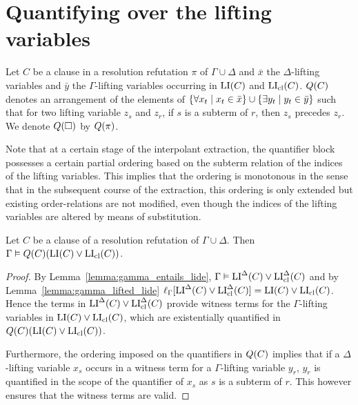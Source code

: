 \documentclass[,%
	draft=false,%
	numbers=noendperiod
	11pt,
	a4paper,
	oneside,%
	openany,
]{memoir}
\begin{document}
\section{Quantifying over the lifting variables}

\begin{defi}
	\label{def:arrow_quantifier_block}
	Let $C$ be a clause in a resolution refutation $\pi$ of $\Gamma\cup\Delta$
	and $\bar x$ the $\Delta$-lifting variables and $\bar y$ the $\Gamma$-lifting variables occurring in $\operatorname{LI}(C)$ and $\operatorname{LI}_{\operatorname{cl}}(C)$.
	$Q(C)$ denotes an arrangement of the elements of  $\{ \forall x_t \mid\nolinebreak x_t \in \bar x\} \cup \{ \exists y_t \mid y_t \in \bar y\}$ such that for two lifting variable $z_s$ and $z_r$, if $s$ is a subterm of $r$, then $z_s$ precedes $z_r$.
	We denote $Q(\square)$ by $Q(\pi)$.
\end{defi}

Note that at a certain stage of the interpolant extraction, the quantifier block possesses a certain partial ordering based on the subterm relation of the indices of the lifting variables.
This implies that the ordering is monotonous in the sense that in the subsequent course of the extraction, this ordering is only extended but existing order-relations are not modified, even though the indices of the lifting variables are altered by means of substitution.


\begin{lemma}
	\label{lemma:gamma_entails_quantified_lide}
	Let $C$ be a clause of a resolution refutation of $\Gamma\cup\Delta$. Then
	$\Gamma\vDash Q(C)(\operatorname{LI}(C) \lor \operatorname{LI}_{\operatorname{cl}}(C))$.
\end{lemma}
\begin{proof}
	By Lemma~\ref{lemma:gamma_entails_lide},
	$\Gamma\vDash \operatorname{LI}^\Delta(C) \lor \operatorname{LI}_{\operatorname{cl}}^\Delta(C)$ and 
	by Lemma~\ref{lemma:gamma_lifted_lide}
	$\ell_{\Gamma}[ \operatorname{LI}^\Delta(C) \lor \operatorname{LI}_{\operatorname{cl}}^\Delta(C)] = \operatorname{LI}(C) \lor \operatorname{LI}_{\operatorname{cl}}(C)$.
	Hence the terms in $\operatorname{LI}^\Delta(C) \lor \operatorname{LI}_{\operatorname{cl}}^\Delta(C)$ provide witness terms for the $\Gamma$-lifting variables in $\operatorname{LI}(C) \lor \operatorname{LI}_{\operatorname{cl}}(C)$, which are existentially quantified in $Q(C) (\operatorname{LI}(C) \lor \operatorname{LI}_{\operatorname{cl}}(C))$.

	Furthermore, the ordering imposed on the quantifiers in $Q(C)$ implies that if a $\Delta$-lifting variable $x_s$ occurs in a witness term for a $\Gamma$-lifting variable $y_r$, $y_r$ is quantified in the scope of the quantifier of $x_s$ as $s$ is a subterm of $r$.
	This however ensures that the witness terms are valid.
\end{proof}
\end{document}
